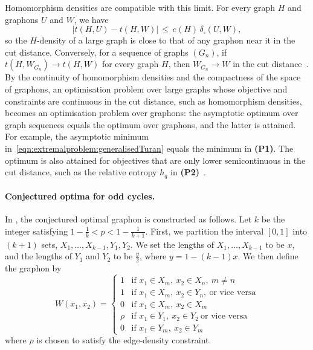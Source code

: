 \documentclass{article}
\theoremstyle{plain}
\theoremstyle{definition}
\theoremstyle{remark}
\begin{document}
Homomorphism densities are compatible with this limit. For every graph $H$ and graphons $U$ and $W$, we have
\[
|t(H, U) - t(H, W)| \,\le\, e(H)\, \delta_\square(U, W),
\]
so the $H$-density of a large graph is close to that of any graphon near it in the cut distance. Conversely, for a sequence of graphs $(G_n)$, if $t(H, W_{G_n}) \to t(H, W)$ for every graph $H$, then $W_{G_n} \to W$ in the cut distance~\citep{lovasz2012large}. By the continuity of homomorphism densities and the compactness of the space of graphons, an optimisation problem over large graphs whose objective and constraints are continuous in the cut distance, such as homomorphism densities, becomes an optimisation problem over graphons: the asymptotic optimum over graph sequences equals the optimum over graphons, and the latter is attained. For example, the asymptotic minimum in~\eqref{eqn:extremalproblem:generalisedTuran} equals the minimum in \textbf{(P1)}. The optimum is also attained for objectives that are only lower semicontinuous in the cut distance, such as the relative entropy $h_q$ in \textbf{(P2)}~\citep{chatterjee2011large}.

\paragraph{Conjectured optima for odd cycles.}\label{sec:oddcycleconjecture}
In \citet{bennett2020minimizing}, the conjectured optimal graphon is constructed as follows.
Let $k$ be the integer satisfying $1 - \frac{1}{k} < p < 1-\frac{1}{k+1}$.
First, we partition the interval $[0,1]$ into $(k+1)$ sets, $X_1, \ldots, X_{k-1}, Y_1, Y_2$.
We set the lengths of $X_1,\ldots,X_{k-1}$ to be $x$, and the lengths of $Y_1$ and $Y_2$ to be $\frac{y}{2}$, where $y=1-(k-1)x$.
We then define the graphon by
\[
  W(x_1, x_2) = \begin{cases}
    1 & \text{if } x_1 \in X_m,\ x_2 \in X_n,\ m \neq n
    \\
    1 & \text{if } x_1 \in X_m,\ x_2 \in Y_n,\ \text{or vice versa}
    \\
    0 & \text{if } x_1 \in X_m,\ x_2 \in X_m
    \\
    \rho & \text{if } x_1 \in Y_1,\ x_2 \in Y_2\ \text{or vice versa}
    \\
    0 & \text{if } x_1 \in Y_m,\ x_2 \in Y_m
  \end{cases}
\]
where $\rho$ is chosen to satisfy the edge-density constraint.
\end{document}

